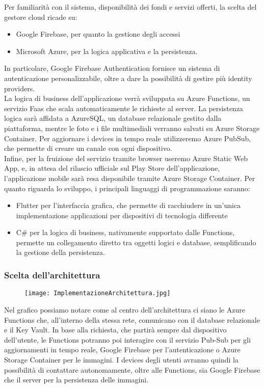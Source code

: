 Per familiarità con il sistema, disponibilità dei fondi e servizi offerti, 
la scelta del gestore cloud ricade su:
\begin{itemize}
    \item Google Firebase, per quanto la gestione degli accessi
    \item Microsoft Azure, per la logica applicativa e la persistenza.
\end{itemize}
In particolare, Google Firebase Authentication fornisce un sistema di autenticazione personalizzabile, 
oltre a dare la possibilità di gestire più identity providers.\\
La logica di business dell'applicazione verrà sviluppata su Azure Functions, un servizio Faas che scala automaticamente le richieste al server.
La persistenza logica sarà affidata a AzureSQL, un database relazionale gestito dalla piattaforma, mentre le foto e i file multimediali verranno salvati su Azure Storage Container.
Per aggiornare i devices in tempo reale utilizzeremo Azure PubSub, che permette di creare un canale con ogni dispositivo.\\
Infine, per la fruizione del servizio tramite browser useremo Azure Static Web App, e, in attesa del rilascio ufficiale sul Play Store dell'applicazione, 
l'applicazione mobile sarà resa disponibile tramite Azure Storage Container.
\linebreak
Per quanto riguarda lo sviluppo, i principali linguaggi di programmazione saranno:
\begin{itemize}
    \item Flutter per l'interfaccia grafica, che permette di racchiudere in un'unica implementazione applicazioni per dispositivi di tecnologia differente
    \item C\# per la logica di business, nativamente supportato dalle Functions, permette un collegamento diretto tra oggetti logici e database, semplificando la gestione della persistenza.
\end{itemize}
\pagebreak

\subsubsection{Scelta dell'architettura}
\begin{figure}[h!]
    \begin{center}
        \texttt{[image: ImplementazioneArchitettura.jpg]}
    \end{center}
\end{figure}
Nel grafico possiamo notare come al centro dell'architettura ci siano le Azure Functions che, all'interno della stessa rete, comunicano con il database relazionale e il Key Vault.
In base alla richiesta, che partirà sempre dal dispositivo dell'utente, le Functions potranno poi interagire con 
il servizio Pub-Sub per gli aggiornamenti in tempo reale, 
Google Firebase per l'autenticazione o 
Azure Storage Container per le immagini.
I devices degli utenti avranno quindi la possibilità di contattare autonomamente, oltre alle Functions, sia Google Firebase che il server per la persistenza delle immagini. 
